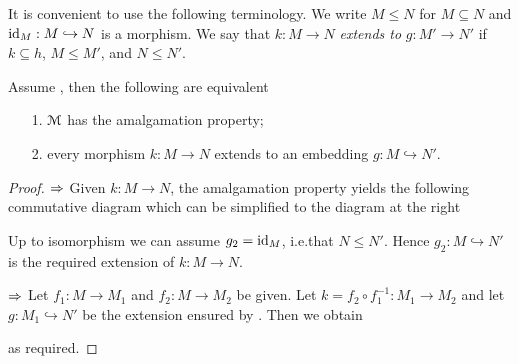 \documentclass[creche.tex]{subfiles}
\begin{document}
It is convenient to use the following terminology. We write \emph{$M\le N$\/} for $M\subseteq N$ and $\textrm{id}_M:M\hookrightarrow N$ is a morphism. We say that $k:M\to N$ \emph{extends to\/} $g:M'\to N'$ if $k\subseteq h$, $M\le M'$, and  $N\le N'$.


\begin{proposition}\label{prop_amalgamation_def}
Assume , then the following are equivalent
\begin{itemize}
\item[1.] $\EuScript M$ has the amalgamation property;
\item[2.] every morphism $k:M\to N$ extends to an embedding $g : M\hookrightarrow N'$.
\end{itemize}
\end{proposition}

\begin{proof}
$\Rightarrow$ Given $k:M\to N$, the amalgamation property yields the following commutative diagram which can be simplified to the diagram at the right

\hfil{}
\hfil{}

Up to isomorphism we can assume $g_2=\textrm{id}_M$, i.e.\@ that $N\le N'$. Hence $g_2:M\hookrightarrow N'$ is the required extension of $k:M\to N$.

$\Rightarrow$ Let  $f_1:M\to M_1$ and $f_2:M\to M_2$ be given. Let $k=f_2\circ f_1^{-1}:M_1\to M_2$ and let  $g:M_1\hookrightarrow N'$ be the extension ensured by . Then we obtain

\hfil{}

as required.
\end{proof}
\end{document}
